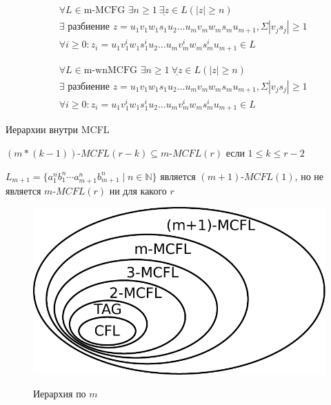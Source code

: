   \begin{theorem}
    \begin{align*}
    &\forall L \in \text{m-MCFG } \exists n \geq 1 \ \underline{\boldsymbol{\exists} z} \in L (|z| \geq n)  \\
    &\exists \text{ разбиение } z=u_1 v_1 w_1 s_1 u_2 \ldots u_m v_m w_m s_m u_{m+1}, \Sigma|v_js_j| \geq 1 \\
    &\forall i \geq 0: z_i = u_1 v_1^i w_1 s_1^i u_2 \ldots u_m v_m^i w_m s_m^i u_{m+1} \in L
    \end{align*}
  \end{theorem}

  \begin{theorem}
    \begin{align*}
    &\forall L \in \text{m-wnMCFG } \exists n \geq 1 \ \underline{\boldsymbol{\forall} z} \in L (|z| \geq n)  \\
    &\exists \text{ разбиение } z=u_1 v_1 w_1 s_1 u_2 \ldots u_m v_m w_m s_m u_{m+1}, \Sigma|v_js_j| \geq 1 \\
    &\forall i \geq 0: z_i = u_1 v_1^i w_1 s_1^i u_2 \ldots u_m v_m^i w_m s_m^i u_{m+1} \in L
    \end{align*}
  \end{theorem}

  Иерархии внутри MCFL
  \begin{theorem}
  $(m*(k-1))$-$MCFL(r-k) \subseteq m$-$MCFL(r) $ если $1 \leq k \leq r - 2$
  \end{theorem}
  
  \begin{theorem}[Seki et al]
  $L_{m+1} = \{a_1^nb_1^n\cdots a_{m+1}^n b_{m+1}^n \mid n\in \mathbb{N}\}$ является $(m+1)$-$MCFL(1)$, но не является $m$-$MCFL(r)$ ни для какого $r$
  \end{theorem}  


\begin{figure}
    \includegraphics[width=\textwidth]{figures/mcfg/mcfg.pdf}
    \label{fig:mcfg_hierarachy_1}    
    \caption{Иерархия по $m$}
\end{figure}  

